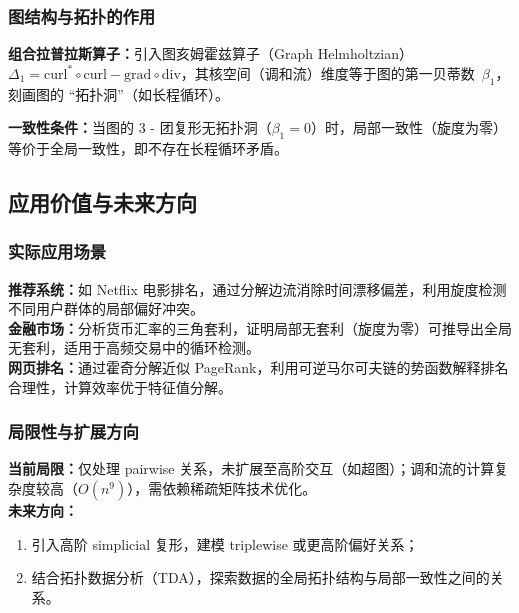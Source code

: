 \documentclass[a4paper]{article}
\begin{document}
\subsubsection{图结构与拓扑的作用}
\indent \textbf{组合拉普拉斯算子：}引入图亥姆霍兹算子（Graph Helmholtzian） \(\Delta_1 = \text{curl}^* \circ \text{curl} - \text{grad} \circ \text{div}\)，其核空间（调和流）维度等于图的第一贝蒂数 \(\beta_1\)，刻画图的 “拓扑洞”（如长程循环）。

\indent \textbf{一致性条件：}当图的 3 - 团复形无拓扑洞（\(\beta_1 = 0\)）时，局部一致性（旋度为零）等价于全局一致性，即不存在长程循环矛盾。

\subsection{应用价值与未来方向}
\subsubsection{实际应用场景}
\indent \textbf{推荐系统：}如 Netflix 电影排名，通过分解边流消除时间漂移偏差，利用旋度检测不同用户群体的局部偏好冲突。\\
\indent \textbf{金融市场：}分析货币汇率的三角套利，证明局部无套利（旋度为零）可推导出全局无套利，适用于高频交易中的循环检测。\\
\indent \textbf{网页排名：}通过霍奇分解近似 PageRank，利用可逆马尔可夫链的势函数解释排名合理性，计算效率优于特征值分解。

\subsubsection{局限性与扩展方向}
\indent \textbf{当前局限：}仅处理 pairwise 关系，未扩展至高阶交互（如超图）；调和流的计算复杂度较高（\(O(n^9)\)），需依赖稀疏矩阵技术优化。\\
\indent \textbf{未来方向：}
\begin{enumerate}
    \item 引入高阶 simplicial 复形，建模 triplewise 或更高阶偏好关系；
    \item 结合拓扑数据分析（TDA），探索数据的全局拓扑结构与局部一致性之间的关系。
\end{enumerate}
\section*{  }
\printbibliography
\end{document}
